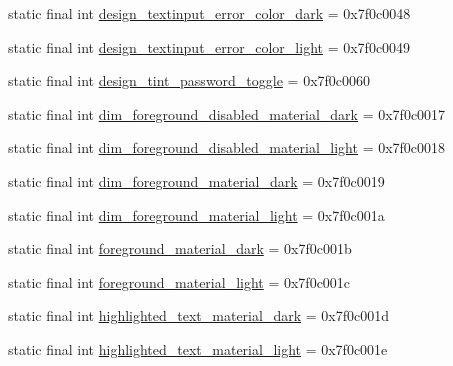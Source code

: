 \begin{CompactItemize}
\item 
static final int \hyperlink{classandroid_1_1support_1_1graphics_1_1drawable_1_1animated_1_1_r_1_1color_1ea991ba8cc3ec30ffb4fa3c2b14aaf8}{design\_\-textinput\_\-error\_\-color\_\-dark} = 0x7f0c0048
\item 
static final int \hyperlink{classandroid_1_1support_1_1graphics_1_1drawable_1_1animated_1_1_r_1_1color_92ee0bdd87e8e552ea53e4b2e29411c7}{design\_\-textinput\_\-error\_\-color\_\-light} = 0x7f0c0049
\item 
static final int \hyperlink{classandroid_1_1support_1_1graphics_1_1drawable_1_1animated_1_1_r_1_1color_331b0b452f983311eeedbc10a6851a8e}{design\_\-tint\_\-password\_\-toggle} = 0x7f0c0060
\item 
static final int \hyperlink{classandroid_1_1support_1_1graphics_1_1drawable_1_1animated_1_1_r_1_1color_3a8656071ed75e97f5823284d582a72f}{dim\_\-foreground\_\-disabled\_\-material\_\-dark} = 0x7f0c0017
\item 
static final int \hyperlink{classandroid_1_1support_1_1graphics_1_1drawable_1_1animated_1_1_r_1_1color_dcb669f775e09b580a70843fc7e017dc}{dim\_\-foreground\_\-disabled\_\-material\_\-light} = 0x7f0c0018
\item 
static final int \hyperlink{classandroid_1_1support_1_1graphics_1_1drawable_1_1animated_1_1_r_1_1color_5fbf3e30ec4e54bd1b63008e30129928}{dim\_\-foreground\_\-material\_\-dark} = 0x7f0c0019
\item 
static final int \hyperlink{classandroid_1_1support_1_1graphics_1_1drawable_1_1animated_1_1_r_1_1color_7ff0f8a6523ac8c23527061fad154b14}{dim\_\-foreground\_\-material\_\-light} = 0x7f0c001a
\item 
static final int \hyperlink{classandroid_1_1support_1_1graphics_1_1drawable_1_1animated_1_1_r_1_1color_c05e85ccc5dabe6c84f301f2e9e8547f}{foreground\_\-material\_\-dark} = 0x7f0c001b
\item 
static final int \hyperlink{classandroid_1_1support_1_1graphics_1_1drawable_1_1animated_1_1_r_1_1color_12d01bc794d0c42de0a6a6bb16945692}{foreground\_\-material\_\-light} = 0x7f0c001c
\item 
static final int \hyperlink{classandroid_1_1support_1_1graphics_1_1drawable_1_1animated_1_1_r_1_1color_a37d1a54862e27df1fd2d1d40ea81b84}{highlighted\_\-text\_\-material\_\-dark} = 0x7f0c001d
\item 
static final int \hyperlink{classandroid_1_1support_1_1graphics_1_1drawable_1_1animated_1_1_r_1_1color_92e2d2151f68dbe8b5062ed39af548fa}{highlighted\_\-text\_\-material\_\-light} = 0x7f0c001e

\end{CompactItemize}
